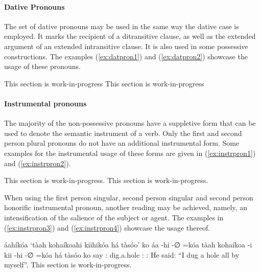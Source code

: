 \documentclass[a4paper, 12pt, oneside]{memoir}
\begin{document}
\paragraph{Dative Pronouns}
The set of dative pronouns may be used in the same way the dative case is employed. It marks the recipient of a ditransitive clause, as well as the extended argument of an extended intransitive clause. It is also used in some possessive constructions. The examples (\ref{ex:datpron1}) and (\ref{ex:datpron2}) showcase the usage of these pronouns.
\begin{examples}
    \ex \label{ex:datpron1}
    This section is work-in-progress
    \ex \label{ex:datpron2}
    This section is work-in-progress
    \end{examples}
\paragraph{Instrumental pronouns}
The majority of the non-possessive pronouns have a suppletive form that can be used to denote the semantic instrument of a verb. Only the first and second person plural pronouns do not have an additional instrumental form. Some examples for the instrumental usage of these forms are given in (\ref{ex:instrpron1}) and (\ref{ex:instrpron2}).
\begin{examples}
\ex This section is work-in-progress. \label{ex:instrpron1}
\ex This section is work-in-progress. \label{ex:instrpron2}
\end{examples}
When using the first person singular, second person singular and second person honorific instrumental pronoun, another reading may be achieved, namely, an intensification of the salience of the subject or agent. The examples in (\ref{ex:instrpron3}) and (\ref{ex:instrpron4}) showcase the usage thereof.
\begin{examples}
\ex \label{ex:instrpron3}
\words áahíkóa `tàah kohaíkoahi kiihikóa há tàsóo' ko
\bits áa -hi -∅ =kóa tàah kohaíkoa -i kii -hi -∅ =kóa há tàsóo ko
\gloss say {\Rpastt} {\St} {\Decl} {\Fs}:{\Agent} dig.a.hole  {\Dep} {\Aux:\Perf} {\Rpastt} {\St} {\Decl}  {\Cngr} {\Fs}:{\Instr} {\Quotative}
\tr He said: ``I dug a hole all by myself''. 
\ex This section is work-in-progress. \label{ex:instrpron4}
\end{examples}
\end{document}
